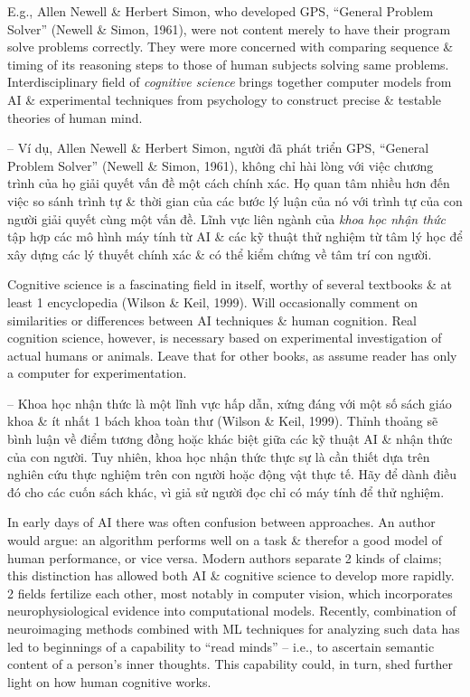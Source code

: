 \documentclass{article}
\begin{document}
\begin{itemize}
\begin{itemize}
\begin{itemize}
\begin{itemize}
				E.g., {\sc Allen Newell \& Herbert Simon}, who developed GPS, ``General Problem Solver'' (Newell \& Simon, 1961), were not content merely to have their program solve problems correctly. They were more concerned with comparing sequence \& timing of its reasoning steps to those of human subjects solving same problems. Interdisciplinary field of {\it cognitive science} brings together computer models from AI \& experimental techniques from psychology to construct precise \& testable theories of human mind.
				
				-- Ví dụ, {\sc Allen Newell \& Herbert Simon}, người đã phát triển GPS, ``General Problem Solver'' (Newell \& Simon, 1961), không chỉ hài lòng với việc chương trình của họ giải quyết vấn đề một cách chính xác. Họ quan tâm nhiều hơn đến việc so sánh trình tự \& thời gian của các bước lý luận của nó với trình tự của con người giải quyết cùng một vấn đề. Lĩnh vực liên ngành của {\it khoa học nhận thức} tập hợp các mô hình máy tính từ AI \& các kỹ thuật thử nghiệm từ tâm lý học để xây dựng các lý thuyết chính xác \& có thể kiểm chứng về tâm trí con người.
				
				Cognitive science is a fascinating field in itself, worthy of several textbooks \& at least 1 encyclopedia (Wilson \& Keil, 1999). Will occasionally comment on similarities or differences between AI techniques \& human cognition. Real cognition science, however, is necessary based on experimental investigation of actual humans or animals. Leave that for other books, as assume reader has only a computer for experimentation.
				
				-- Khoa học nhận thức là một lĩnh vực hấp dẫn, xứng đáng với một số sách giáo khoa \& ít nhất 1 bách khoa toàn thư (Wilson \& Keil, 1999). Thỉnh thoảng sẽ bình luận về điểm tương đồng hoặc khác biệt giữa các kỹ thuật AI \& nhận thức của con người. Tuy nhiên, khoa học nhận thức thực sự là cần thiết dựa trên nghiên cứu thực nghiệm trên con người hoặc động vật thực tế. Hãy để dành điều đó cho các cuốn sách khác, vì giả sử người đọc chỉ có máy tính để thử nghiệm.
				
				In early days of AI there was often confusion between approaches. An author would argue: an algorithm performs well on a task \& therefor a good model of human performance, or vice versa. Modern authors separate 2 kinds of claims; this distinction has allowed both AI \& cognitive science to develop more rapidly. 2 fields fertilize each other, most notably in computer vision, which incorporates neurophysiological evidence into computational models. Recently, combination of neuroimaging methods combined with ML techniques for analyzing such data has led to beginnings of a capability to ``read minds'' -- i.e., to ascertain semantic content of a person's inner thoughts. This capability could, in turn, shed further light on how human cognitive works.
				

\end{itemize}
\end{itemize}
\end{itemize}
\end{itemize}
\end{document}
